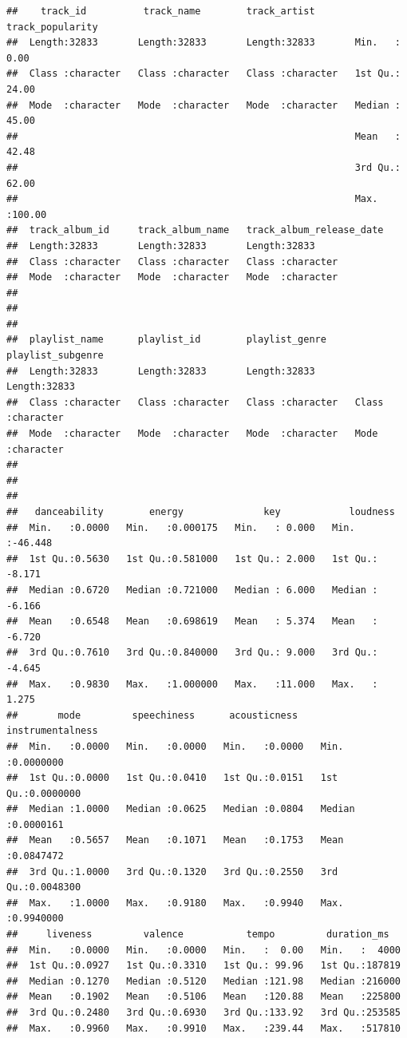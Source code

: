 \documentclass[
]{book}
\begin{document}
\begin{verbatim}
##    track_id          track_name        track_artist       track_popularity
##  Length:32833       Length:32833       Length:32833       Min.   :  0.00  
##  Class :character   Class :character   Class :character   1st Qu.: 24.00  
##  Mode  :character   Mode  :character   Mode  :character   Median : 45.00  
##                                                           Mean   : 42.48  
##                                                           3rd Qu.: 62.00  
##                                                           Max.   :100.00  
##  track_album_id     track_album_name   track_album_release_date
##  Length:32833       Length:32833       Length:32833            
##  Class :character   Class :character   Class :character        
##  Mode  :character   Mode  :character   Mode  :character        
##                                                                
##                                                                
##                                                                
##  playlist_name      playlist_id        playlist_genre     playlist_subgenre 
##  Length:32833       Length:32833       Length:32833       Length:32833      
##  Class :character   Class :character   Class :character   Class :character  
##  Mode  :character   Mode  :character   Mode  :character   Mode  :character  
##                                                                             
##                                                                             
##                                                                             
##   danceability        energy              key            loudness      
##  Min.   :0.0000   Min.   :0.000175   Min.   : 0.000   Min.   :-46.448  
##  1st Qu.:0.5630   1st Qu.:0.581000   1st Qu.: 2.000   1st Qu.: -8.171  
##  Median :0.6720   Median :0.721000   Median : 6.000   Median : -6.166  
##  Mean   :0.6548   Mean   :0.698619   Mean   : 5.374   Mean   : -6.720  
##  3rd Qu.:0.7610   3rd Qu.:0.840000   3rd Qu.: 9.000   3rd Qu.: -4.645  
##  Max.   :0.9830   Max.   :1.000000   Max.   :11.000   Max.   :  1.275  
##       mode         speechiness      acousticness    instrumentalness   
##  Min.   :0.0000   Min.   :0.0000   Min.   :0.0000   Min.   :0.0000000  
##  1st Qu.:0.0000   1st Qu.:0.0410   1st Qu.:0.0151   1st Qu.:0.0000000  
##  Median :1.0000   Median :0.0625   Median :0.0804   Median :0.0000161  
##  Mean   :0.5657   Mean   :0.1071   Mean   :0.1753   Mean   :0.0847472  
##  3rd Qu.:1.0000   3rd Qu.:0.1320   3rd Qu.:0.2550   3rd Qu.:0.0048300  
##  Max.   :1.0000   Max.   :0.9180   Max.   :0.9940   Max.   :0.9940000  
##     liveness         valence           tempo         duration_ms    
##  Min.   :0.0000   Min.   :0.0000   Min.   :  0.00   Min.   :  4000  
##  1st Qu.:0.0927   1st Qu.:0.3310   1st Qu.: 99.96   1st Qu.:187819  
##  Median :0.1270   Median :0.5120   Median :121.98   Median :216000  
##  Mean   :0.1902   Mean   :0.5106   Mean   :120.88   Mean   :225800  
##  3rd Qu.:0.2480   3rd Qu.:0.6930   3rd Qu.:133.92   3rd Qu.:253585  
##  Max.   :0.9960   Max.   :0.9910   Max.   :239.44   Max.   :517810
\end{verbatim}
\end{document}
